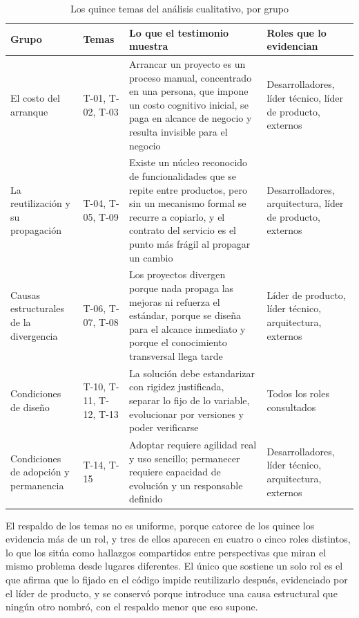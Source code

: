 \begin{table}[H]
\centering
{\footnotesize
\begin{tabular}{p{2.9cm}p{1.7cm}p{6.9cm}p{3.1cm}}
\toprule
\textbf{Grupo} & \textbf{Temas} & \textbf{Lo que el testimonio muestra} & \textbf{Roles que lo evidencian} \\
\midrule
El costo del arranque & T-01, T-02, T-03 & Arrancar un proyecto es un proceso manual, concentrado en una persona, que impone un costo cognitivo inicial, se paga en alcance de negocio y resulta invisible para el negocio & Desarrolladores, líder técnico, líder de producto, externos \\
La reutilización y su propagación & T-04, T-05, T-09 & Existe un núcleo reconocido de funcionalidades que se repite entre productos, pero sin un mecanismo formal se recurre a copiarlo, y el contrato del servicio es el punto más frágil al propagar un cambio & Desarrolladores, arquitectura, líder de producto, externos \\
Causas estructurales de la divergencia & T-06, T-07, T-08 & Los proyectos divergen porque nada propaga las mejoras ni refuerza el estándar, porque se diseña para el alcance inmediato y porque el conocimiento transversal llega tarde & Líder de producto, líder técnico, arquitectura, externos \\
Condiciones de diseño & T-10, T-11, T-12, T-13 & La solución debe estandarizar con rigidez justificada, separar lo fijo de lo variable, evolucionar por versiones y poder verificarse & Todos los roles consultados \\
Condiciones de adopción y permanencia & T-14, T-15 & Adoptar requiere agilidad real y uso sencillo; permanecer requiere capacidad de evolución y un responsable definido & Desarrolladores, líder técnico, arquitectura, externos \\
\bottomrule
\end{tabular}
}
\caption{Los quince temas del análisis cualitativo, por grupo}
\label{tab:grupos}
\end{table}

El respaldo de los temas no es uniforme, porque catorce de los quince los
evidencia más de un rol, y tres de ellos aparecen en cuatro o cinco roles
distintos, lo que los sitúa como hallazgos compartidos entre perspectivas que
miran el mismo problema desde lugares diferentes. El único que sostiene un
solo rol es el que afirma que lo fijado en el código impide reutilizarlo
después, evidenciado por el líder de producto, y se conservó porque introduce
una causa estructural que ningún otro nombró, con el respaldo menor que eso
supone.

